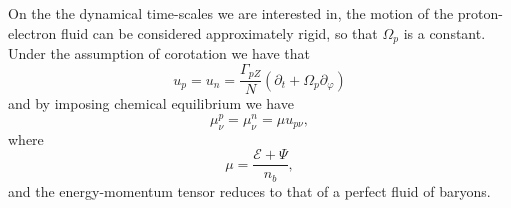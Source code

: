 \documentclass[usenatbib%
]{mnras}
\begin{document}
On the the dynamical time-scales we are interested in, the motion of the proton-electron fluid can be considered approximately rigid, so that $\Omega_p$ is a constant. Under the assumption of corotation we have that 
\begin{equation}
u_p =u_n= \dfrac{\Gamma_{pZ}}{N} (\partial_t + \Omega_p \partial_\varphi) 
\end{equation}
and by imposing chemical equilibrium we have
\begin{equation}\label{quantofacileora}
\mu_{\nu}^p = \mu_{\nu}^n = \mu u_{p\nu},
\end{equation}
where
\begin{equation}
\mu = \frac{\mathcal{E} + \Psi }{n_b},
\end{equation}
and the energy-momentum tensor reduces to that of a perfect fluid of baryons.
\end{document}
